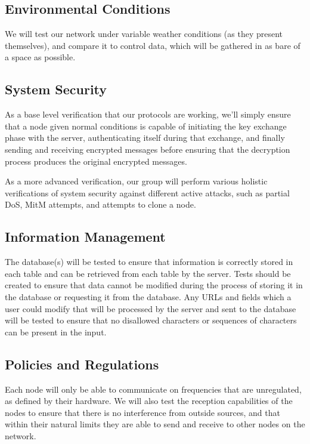 \documentclass[tikz,a4paper,titlepage]{article}
\begin{document}
\subsection{Environmental Conditions}

We will test our network under variable weather conditions (as they present themselves), and compare it to control data, which will be gathered in as bare of a space as possible.

\subsection{System Security} %

As a base level verification that our protocols are working, we'll simply ensure that a node given normal conditions is capable of initiating the key exchange phase with the server, authenticating itself during that exchange, and finally sending and receiving encrypted messages before ensuring that the decryption process produces the original encrypted messages.

As a more advanced verification, our group will perform various holistic verifications of system security against different active attacks, such as partial DoS, MitM attempts, and attempts to clone a node.

\subsection{Information Management} %

The database(s) will be tested to ensure that information is correctly stored in each table and can be retrieved from each table by the server. Tests should be created to ensure that data cannot be modified during the process of storing it in the database or requesting it from the database. Any URLs and fields which a user could modify that will be processed by the server and sent to the database will be tested to ensure that no disallowed characters or sequences of characters can be present in the input.

\subsection{Policies and Regulations}

Each node will only be able to communicate on frequencies that are unregulated, as defined by their hardware. We will also test the reception capabilities of the nodes to ensure that there is no interference from outside sources, and that within their natural limits they are able to send and receive to other nodes on the network.
\end{document}

